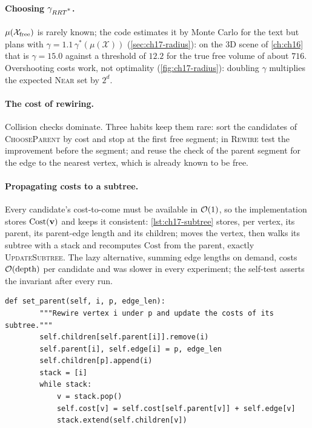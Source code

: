 \paragraph{Choosing $\gamma_{RRT\textsuperscript{*}}$.} $\mu(\mathcal{X}_{\mathrm{free}})$ is rarely known; the
code estimates it by Monte Carlo for the text but plans with
$\gamma=1.1\,\gamma^*(\mu(\mathcal{X}))$ (\cref{sec:ch17-radius}): on the
3D scene of \cref{ch:ch16} that is
$\gamma=15.0$ against a threshold of $12.2$ for the true free volume of
about $716$. Overshooting costs work, not optimality
(\cref{fig:ch17-radius}): doubling $\gamma$ multiplies the expected
\textsc{Near} set by $2^d$.

\paragraph{The cost of rewiring.} Collision checks dominate. Three habits
keep them rare: sort the candidates of \textsc{ChooseParent} by cost and
stop at the first free segment; in \textsc{Rewire} test the improvement
before the segment; and reuse the check of the parent segment for the
edge to the nearest vertex, which is already known to be free.

\paragraph{Propagating costs to a subtree.} Every candidate's cost-to-come
must be available in $\mathcal{O}\!\left(1\right)$, so the implementation stores
$\mathrm{Cost}(\mathbf{v})$ and keeps it consistent: \cref{lst:ch17-subtree} stores,
per vertex, its parent, its parent-edge length and its children;
 moves the vertex, then walks its subtree
with a stack and recomputes $\mathrm{Cost}$ from the parent, exactly
\textsc{UpdateSubtree}. The lazy alternative, summing edge lengths on
demand, costs $\mathcal{O}\!\left(\text{depth}\right)$ per candidate and was slower in every
experiment; the self-test asserts the invariant after every run.

\begin{lstlisting}[caption={\textsc{UpdateSubtree} (from \code{code/ch17\_rrt\_star.py}): rewiring vertex \code{i} under \code{p} and recomputing the cost of every descendant with an explicit stack.},label={lst:ch17-subtree}]
    def set_parent(self, i, p, edge_len):
        """Rewire vertex i under p and update the costs of its subtree."""
        self.children[self.parent[i]].remove(i)
        self.parent[i], self.edge[i] = p, edge_len
        self.children[p].append(i)
        stack = [i]
        while stack:
            v = stack.pop()
            self.cost[v] = self.cost[self.parent[v]] + self.edge[v]
            stack.extend(self.children[v])
\end{lstlisting}

